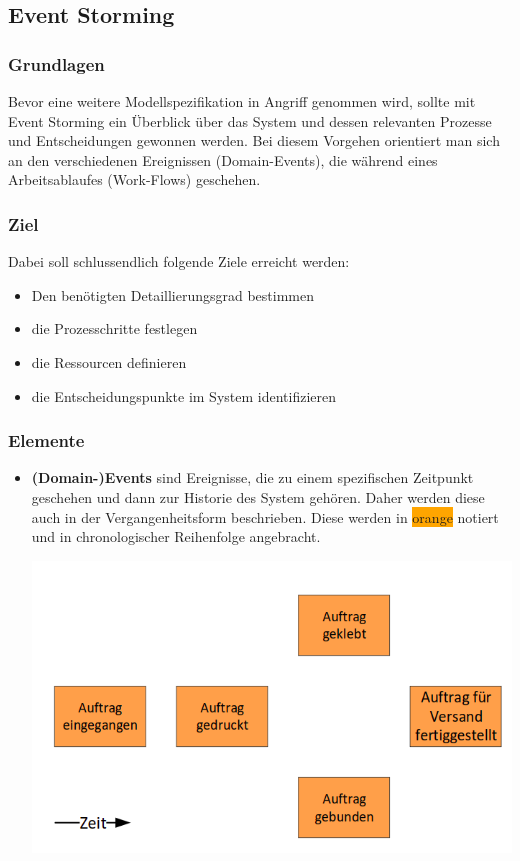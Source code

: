 \subsection{Event Storming}
\subsubsection{Grundlagen}
Bevor eine weitere Modellspezifikation in Angriff genommen wird, sollte mit Event Storming ein Überblick über das System und dessen relevanten Prozesse und Entscheidungen gewonnen werden. Bei diesem Vorgehen orientiert man sich an den verschiedenen Ereignissen (Domain-Events), die während eines Arbeitsablaufes (Work-Flows) geschehen.
\subsubsection{Ziel}
Dabei soll schlussendlich folgende Ziele erreicht werden:
\begin{itemize}
    \item Den benötigten Detaillierungsgrad bestimmen
    \item die Prozesschritte festlegen
    \item die Ressourcen definieren
    \item die Entscheidungspunkte im System identifizieren
\end{itemize}
\subsubsection{Elemente}
\begin{itemize}
    \item \textbf{(Domain-)Events} sind Ereignisse, die zu einem spezifischen Zeitpunkt geschehen und dann zur Historie des System gehören. Daher werden diese auch in der Vergangenheitsform beschrieben. Diese werden in \colorbox{orange}{orange} notiert und in chronologischer Reihenfolge angebracht.
    
\begin{minipage}[t]{1\textwidth}
    \centering
	\includegraphics[width=0.6\linewidth]{images/domain-events.png}
\end{minipage}

 
\end{itemize}

